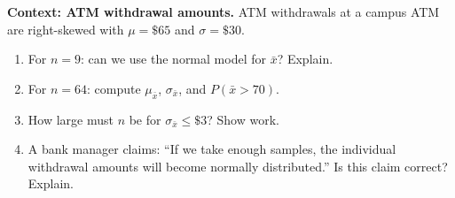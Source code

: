 \documentclass[10pt]{article}
\begin{document}
\vspace{0.15in}

\begin{tcolorbox}[colback=redbg, colframe=black!40, boxrule=0.6pt, arc=2mm,
    left=3mm, right=3mm, top=2mm, bottom=2mm, title=\textbf{Tier E --- Extension}]
\textbf{Context: ATM withdrawal amounts.}
ATM withdrawals at a campus ATM are right-skewed with $\mu = \$65$ and $\sigma = \$30$.

\begin{enumerate}
  \item For $n = 9$: can we use the normal model for $\bar{x}$? Explain.
  \item For $n = 64$: compute $\mu_{\bar{x}}$, $\sigma_{\bar{x}}$, and $P(\bar{x} > 70)$.
        \vspace{1.0in}
  \item How large must $n$ be for $\sigma_{\bar{x}} \le \$3$? Show work.
        \vspace{0.8in}
  \item A bank manager claims: ``If we take enough samples, the individual withdrawal amounts
        will become normally distributed.'' Is this claim correct? Explain.
\end{enumerate}
\end{tcolorbox}
\end{document}
